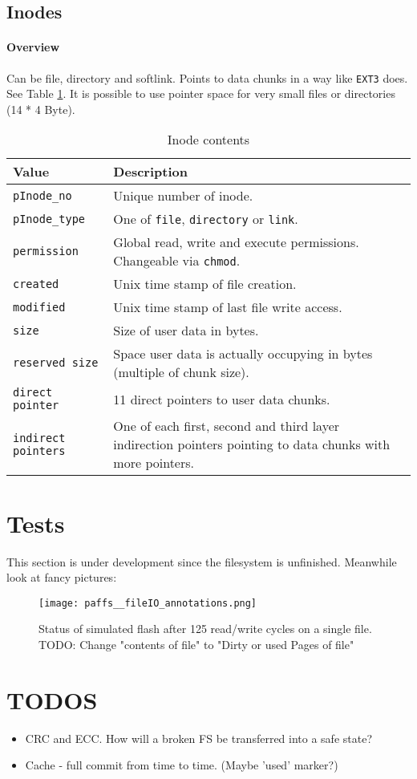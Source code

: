\subsection{Inodes}
\label{inode}
\paragraph{Overview}
Can be file, directory and softlink. Points to data chunks in a way like \texttt{EXT3} does. See Table \ref{tab:pinode}. It is possible to use pointer space for very small files or directories (14 * 4 Byte).
\begin{table}[htbp]
\caption{Inode contents}
\label{tab:pinode}
\begin{tabularx}{\textwidth}{lp{11cm}p{2.5cm}}
\toprule
Value & Description\\
\midrule
\texttt{pInode\_no} & Unique number of inode. \\
\texttt{pInode\_type} & One of \texttt{file}, \texttt{directory} or \texttt{link}.\\
\texttt{permission} & Global read, write and execute permissions. Changeable via \texttt{chmod}.\\
\texttt{created} & Unix time stamp of file creation.\\
\texttt{modified} & Unix time stamp of last file write access.\\
\texttt{size} & Size of user data in bytes. \\
\texttt{reserved size} & Space user data is actually occupying in bytes (multiple of chunk size).\\
\texttt{direct pointer} & 11 direct pointers to user data chunks.\\
\texttt{indirect pointers} & One of each first, second and third layer indirection pointers pointing to data chunks with more pointers.\\
\bottomrule
\end{tabularx}
\end{table} 

\section{Tests}

This section is under development since the filesystem is unfinished. Meanwhile look at fancy pictures:

\begin{figure}[htp]
	\centering\texttt{[image: paffs\_\_fileIO\_annotations.png]}
	\caption{\label{fig:fileIO} Status of simulated flash after 125 read/write cycles on a single file.\\TODO: Change "contents of file" to "Dirty or used Pages of file"}
\end{figure}


\appendix
\section{TODOS}
\begin{itemize}
	\item CRC and ECC. How will a broken FS be transferred into a safe state?
	\item Cache - full commit from time to time. (Maybe 'used' marker?)
\end{itemize}